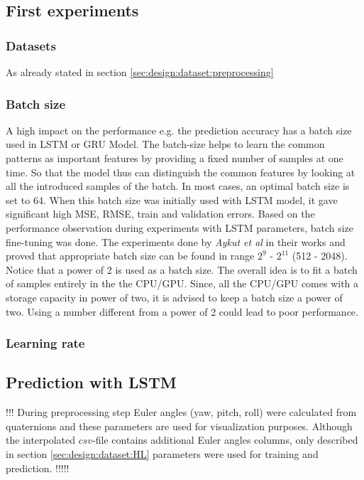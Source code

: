 \subsection{First experiments}
\label{sec:eval:experiments:early}

\subsubsection{Datasets}
\label{sec:eval:experiments:early:ds}
As already stated in section \ref{sec:design:dataset:preprocessing}

\subsubsection{Batch size}
\label{sec:eval:experiments:early:batch}
A high impact on the performance e.g. the prediction accuracy has a batch size used in LSTM or GRU Model. The batch-size helps to learn the common patterns as important features by providing a fixed number of samples at one time. So that the model thus can distinguish the common features by looking at all the introduced samples of the batch. In most cases, an optimal batch size is set to 64. When this batch size was initially used with LSTM model, it gave significant high MSE, RMSE, train and validation errors. Based on the performance observation during experiments with LSTM parameters, batch size fine-tuning was done. The experiments done by \textit{Aykut et al} in their works \cite{delay_compensation_360} and \cite{telepresence} proved that appropriate batch size can be found in range $2^{9}$ - $2^{11}$ (512 - 2048). Notice that a power of 2 is used as a batch size. The overall idea is to fit a batch of samples entirely in the the CPU/GPU. Since, all the CPU/GPU comes with a storage capacity in power of two, it is advised to keep a batch size a power of two. Using a number different from a power of 2 could lead to poor performance.

\subsubsection{Learning rate}
\label{sec:eval:experiments:early:lr}

\subsection{Prediction with LSTM}
\label{sec:eval:experiments:lstm}
!!!
During preprocessing step Euler angles (yaw, pitch, roll) were calculated from quaternions and these parameters are used for visualization purposes. Although the interpolated $csv$-file contains additional Euler angles columns, only described in section \ref{sec:design:dataset:HL} parameters were used for training and prediction.
!!!!!

